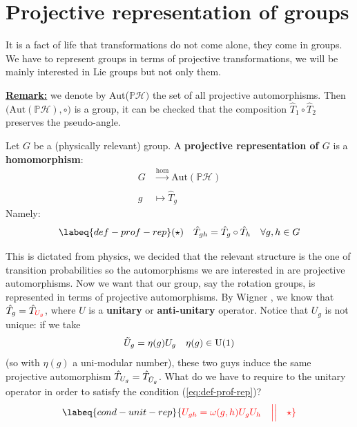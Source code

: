\documentclass[../main.tex]{subfiles}
\begin{document}
\section{Projective representation of groups}
It is a fact of life that transformations do not come alone, they come in groups. We have to represent groups in terms of projective transformations, we will be mainly interested in Lie groups but not only them. 

\underline{\textbf{Remark:}} we denote by Aut($\mathbb{P}\mathcal{H})$ the set of all projective automorphisms. Then $
\big(\textrm{Aut}(\mathbb{P}\mathcal{H}),\circ\big)$ is a group, it can be checked that the composition $\hat{T}_1\circ\hat{T}_2$ preserves the pseudo-angle. 
\begin{definition}
Let $G$ be a (physically relevant) group. A \textbf{projective representation of $G$} is a \textbf{homomorphism}:
\begin{align*}
    G&\xrightarrow[]{{\text{hom}}}\text{Aut}(\mathbb{P}\mathcal{H})\\
    g&\mapsto \hat{T}_g
\end{align*}
Namely:
\begin{equation}\labeq{def-prof-rep}
(\star) \quad \hat{T}_{gh}=\hat{T}_g\circ\hat{T}_h \quad \forall g,h\in G
\end{equation}
\end{definition}
This is dictated from physics, we decided that the relevant structure is the one of transition probabilities so the automorphisms we are interested in are projective automorphisms. Now we want that our group, say the rotation groups, is represented in terms of projective automorphisms. By Wigner , we know that $\hat{T}_g=\hat{T}_{\color{red}U_g}$, where $U$ is a \textbf{unitary} or \textbf{anti-unitary} operator. Notice that $U_g$ is not unique: if we take 
\[
\Tilde{U}_g=\eta(g)U_g \quad \eta(g)\in\textrm{U}(1)
\]
(so with $\eta(g)$ a uni-modular number), these two guys induce the same projective automorphism $\hat{T}_{U_g}=\hat{T}_{\Tilde{U}_g}$. What do we have to require to the unitary operator in order to satisfy the condition (\ref{eq:def-prof-rep})?
\begin{equation}\labeq{cond-unit-rep}
{\color{red}U_{gh}=\omega(g,h)U_gU_h \quad \Big|\Big| \quad \star}
\end{equation}
\end{document}
